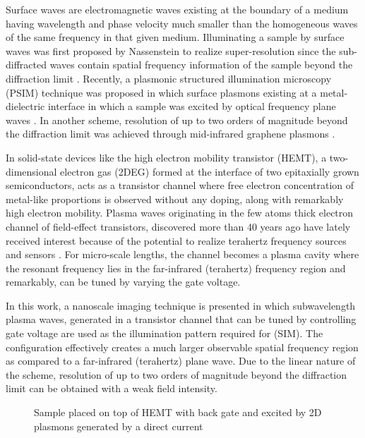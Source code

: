 \documentclass[11pt]{article}
\begin{document}
Surface waves are electromagnetic waves existing at the boundary of a medium having wavelength and phase velocity much smaller than the homogeneous waves of the same frequency in that given medium. Illuminating a sample by surface waves was first proposed by Nassenstein to realize super-resolution since the sub-diffracted waves contain spatial frequency information of the sample beyond the diffraction limit \cite{Nassenstein1970}. Recently, a plasmonic structured illumination microscopy (PSIM) technique was proposed in which surface plasmons existing at a metal-dielectric interface in which a sample was excited by  optical frequency plane waves \cite{Wei2010}. In another scheme, resolution of up to two orders of magnitude beyond the diffraction limit was achieved through mid-infrared graphene plasmons \cite{Zeng2014}.

In solid-state devices like the  high electron mobility transistor (HEMT), a two-dimensional electron gas (2DEG) formed at the interface of two epitaxially grown semiconductors, acts as a transistor channel where free electron concentration of metal-like proportions is observed without any doping, along with remarkably high electron mobility. Plasma waves originating in the few atoms thick electron channel of field-effect transistors, discovered more than 40 years ago have lately received interest because of the potential to realize terahertz frequency sources and sensors \cite{Dyakonov1993,Dyakonov1996,Popov2005,Otsuji2006,Muravjov2010}. For micro-scale lengths, the channel becomes a plasma cavity where the resonant frequency lies in the far-infrared (terahertz) frequency region and remarkably, can be tuned by varying the gate voltage.


In this work, a nanoscale imaging technique is presented in which subwavelength plasma waves, generated in a transistor channel that can be tuned by controlling gate voltage are used as the illumination pattern required for (SIM). The configuration effectively creates a much larger observable spatial frequency region as compared to a far-infrared (terahertz) plane wave. Due to the linear nature of the scheme, resolution of up to two orders of magnitude beyond the diffraction limit can be obtained with a weak field intensity.
%
\begin{figure}[t!]
  \centering
  \def\svgwidth{\linewidth}
  
  \caption{Sample placed on top of HEMT with back gate and excited by 2D plasmons generated by a direct current}
  \label{fig:struct}
\end{figure}
%
\end{document}
